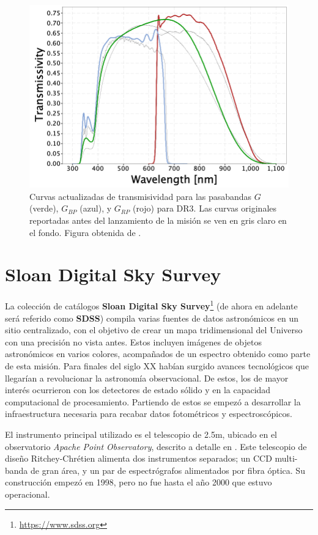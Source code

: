 \begin{figure}[!ht]
    \centering
    \includegraphics[scale=0.4]{Muestra/Secciones/Figures/Figura Gaia Pasabandas DR3.png}
    \caption{Curvas actualizadas de transmisividad para las pasabandas $G$
    (verde), $G_{BP}$ (azul), y $G_{RP}$ (rojo) para DR3. Las curvas originales
    reportadas antes del lanzamiento de la misión se ven en gris claro en el
    fondo. Figura obtenida de
    .}
    \label{figuraGaiaPasabandasDr3}
\end{figure}

\section{Sloan Digital Sky Survey}

La colección de catálogos \textbf{Sloan Digital Sky
Survey}\footnote{\url{https://www.sdss.org}} (de ahora en adelante será referido
como \textbf{SDSS}) compila varias fuentes de datos astronómicos
en un sitio centralizado, con el objetivo de crear un mapa tridimensional del
Universo con una precisión no vista antes. Estos incluyen imágenes de objetos
astronómicos en varios colores, acompañados de un espectro obtenido como parte
de esta misión. Para finales del siglo XX habían surgido avances
tecnológicos que llegarían a revolucionar la astronomía observacional. De estos,
los de mayor interés ocurrieron con los detectores de estado sólido y en la
capacidad computacional de procesamiento. Partiendo de estos se empezó a
desarrollar la infraestructura necesaria para recabar datos fotométricos y
espectroscópicos.

El instrumento principal utilizado es el telescopio de 2.5m, ubicado en el
observatorio \textit{Apache Point Observatory}, descrito a detalle en
. Este telescopio de diseño Ritchey-Chrétien
alimenta dos instrumentos separados; un CCD multi-banda de gran área, y un par
de espectrógrafos alimentados por fibra óptica. Su construcción empezó en 1998,
pero no fue hasta el año 2000 que estuvo operacional.

